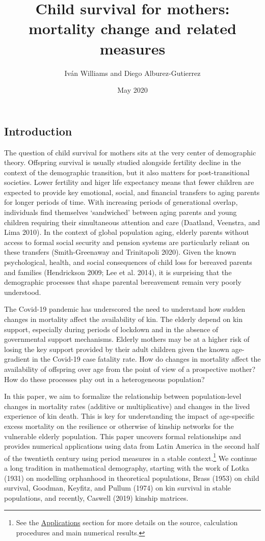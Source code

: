 \documentclass[
]{article}
\title{Child survival for mothers: mortality change and related measures}
\author{Iván Williams and Diego Alburez-Gutierrez}
\date{May 2020}
\begin{document}
\maketitle

\hypertarget{introduction}{%
\subsection{Introduction}\label{introduction}}

The question of child survival for mothers sits at the very center of
demographic theory. Offspring survival is usually studied alongside
fertility decline in the context of the demographic transition, but it
also matters for post-transitional societies. Lower fertility and higer
life expectancy means that fewer children are expected to provide key
emotional, social, and financial transfers to aging parents for longer
periods of time. With increasing periods of generational overlap,
individuals find themselves `sandwiched' between aging parents and young
children requiring their simultaneous attention and care (Daatland,
Veenstra, and Lima 2010). In the context of global population aging,
elderly parents without access to formal social security and pension
systems are particularly reliant on these transfers (Smith-Greenaway and
Trinitapoli 2020). Given the known psychological, health, and social
consequences of child loss for bereaved parents and families
(Hendrickson 2009; Lee et al. 2014), it is surprising that the
demographic processes that shape parental bereavement remain very poorly
understood.

The Covid-19 pandemic has underscored the need to understand how sudden
changes in mortality affect the availability of kin. The elderly depend
on kin support, especially during periods of lockdown and in the absence
of governmental support mechanisms. Elderly mothers may be at a higher
risk of losing the key support provided by their adult children given
the known age-gradient in the Covid-19 case fatality rate. How do
changes in mortality affect the availability of offspring over age from
the point of view of a prospective mother? How do these processes play
out in a heterogeneous population?

In this paper, we aim to formalize the relationship between
population-level changes in mortality rates (additive or multiplicative)
and changes in the lived experience of kin death. This is key for
understanding the impact of age-specific excess mortality on the
resilience or otherwise of kinship networks for the vulnerable elderly
population. This paper uncovers formal relationships and provides
numerical applications using data from Latin America in the second half
of the twentieth century using period measures in a stable
context.\footnote{See the \protect\hyperlink{Applications}{Applications}
  section for more details on the source, calculation procedures and
  main numerical results.} We continue a long tradition in mathematical
demography, starting with the work of Lotka (1931) on modelling
orphanhood in theoretical populations, Brass (1953) on child survival,
Goodman, Keyfitz, and Pullum (1974) on kin survival in stable
populations, and recently, Caswell (2019) kinship matrices.
\end{document}
